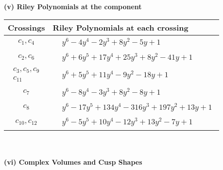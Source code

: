 \documentclass[1p]{elsarticle_modified}
\theoremstyle{definition}
\begin{document}
\newpage\renewcommand{\arraystretch}{1}
\flushleft \textbf{(v) Riley Polynomials at the component}\newline \\
\begin{tabular}{m{50pt}|m{274pt}}
Crossings & \hspace{64pt}Riley Polynomials at each crossing \\
\hline $$\begin{aligned}c_{1},c_{4}\end{aligned}$$&$\begin{aligned}
&y^6-4 y^4-2 y^3+8 y^2-5 y+1
\end{aligned}$\\
\hline $$\begin{aligned}c_{2},c_{6}\end{aligned}$$&$\begin{aligned}
&y^6+6 y^5+17 y^4+25 y^3+8 y^2-41 y+1
\end{aligned}$\\
\hline $$\begin{aligned}c_{3},c_{5},c_{9}\\c_{11}\end{aligned}$$&$\begin{aligned}
&y^6+5 y^5+11 y^4-9 y^2-18 y+1
\end{aligned}$\\
\hline $$\begin{aligned}c_{7}\end{aligned}$$&$\begin{aligned}
&y^6-8 y^4-3 y^3+8 y^2-8 y+1
\end{aligned}$\\
\hline $$\begin{aligned}c_{8}\end{aligned}$$&$\begin{aligned}
&y^6-17 y^5+134 y^4-316 y^3+197 y^2+13 y+1
\end{aligned}$\\
\hline $$\begin{aligned}c_{10},c_{12}\end{aligned}$$&$\begin{aligned}
&y^6-5 y^5+10 y^4-12 y^3+13 y^2-7 y+1
\end{aligned}$\\
\hline
\end{tabular}\\~\\
\newpage\flushleft \textbf{(vi) Complex Volumes and Cusp Shapes}
\end{document}
